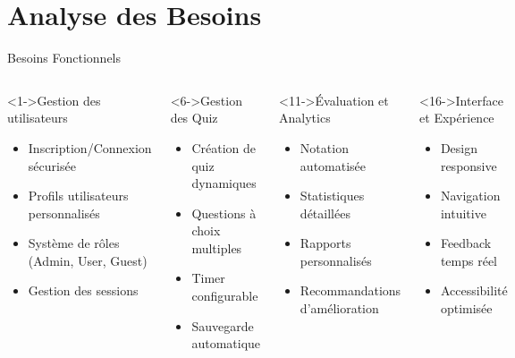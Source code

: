 \documentclass[aspectratio=169]{beamer}
\begin{document}
\section{Analyse des Besoins}

\begin{frame}{Besoins Fonctionnels}
    \begin{columns}[T]
        \begin{block}<1->{Gestion des utilisateurs}
            \begin{itemize}
                \item<2-> Inscription/Connexion sécurisée
                \item<3-> Profils utilisateurs personnalisés
                \item<4-> Système de rôles (Admin, User, Guest)
                \item<5-> Gestion des sessions
            \end{itemize}
        \end{block}

        \begin{block}<6->{Gestion des Quiz}
            \begin{itemize}
                \item<7-> Création de quiz dynamiques
                \item<8-> Questions à choix multiples
                \item<9-> Timer configurable
                \item<10-> Sauvegarde automatique
            \end{itemize}
        \end{block}

        \begin{block}<11->{Évaluation et Analytics}
            \begin{itemize}
                \item<12-> Notation automatisée
                \item<13-> Statistiques détaillées
                \item<14-> Rapports personnalisés
                \item<15-> Recommandations d'amélioration
            \end{itemize}
        \end{block}

        \begin{block}<16->{Interface et Expérience}
            \begin{itemize}
                \item<17-> Design responsive
                \item<18-> Navigation intuitive
                \item<19-> Feedback temps réel
                \item<20-> Accessibilité optimisée
            \end{itemize}
        \end{block}
    \end{columns}
\end{frame}
\end{document}

